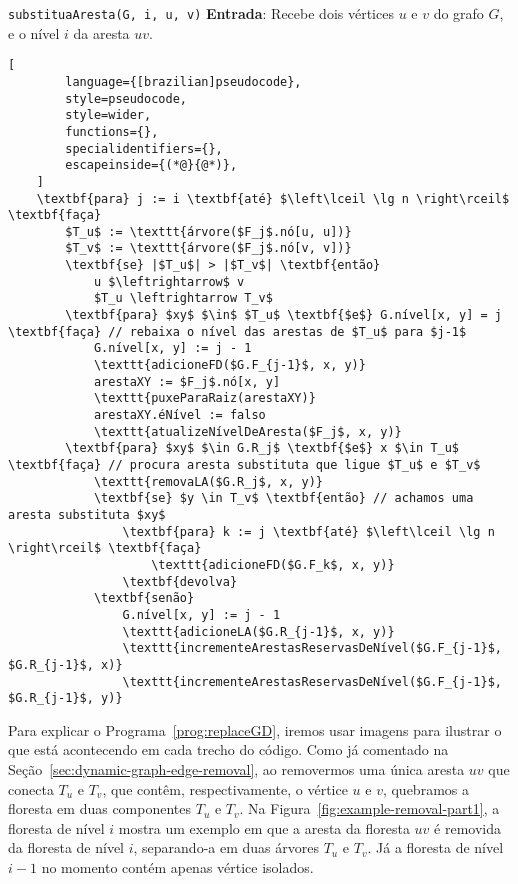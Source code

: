 \begin{programruledcaption}{\texttt{substituaAresta(G, i, u, v)} \label{prog:replaceGD}}
    \noindent\textbf{Entrada}: Recebe dois vértices $u$ e $v$ do grafo $G$, e o nível $i$ da aresta $uv$.
    \vspace{-0.5\baselineskip}
    \begin{lstlisting}[
        language={[brazilian]pseudocode},
        style=pseudocode,
        style=wider,
        functions={},
        specialidentifiers={},
        escapeinside={(*@}{@*)},
    ]
    \textbf{para} j := i \textbf{até} $\left\lceil \lg n \right\rceil$ \textbf{faça}
        $T_u$ := \texttt{árvore($F_j$.nó[u, u])}
        $T_v$ := \texttt{árvore($F_j$.nó[v, v])}    
        \textbf{se} |$T_u$| > |$T_v$| \textbf{então}
            u $\leftrightarrow$ v
            $T_u \leftrightarrow T_v$
        \textbf{para} $xy$ $\in$ $T_u$ \textbf{$e$} G.nível[x, y] = j \textbf{faça} // rebaixa o nível das arestas de $T_u$ para $j-1$
            G.nível[x, y] := j - 1
            \texttt{adicioneFD($G.F_{j-1}$, x, y)}
            arestaXY := $F_j$.nó[x, y]
            \texttt{puxeParaRaiz(arestaXY)}
            arestaXY.éNível := falso
            \texttt{atualizeNívelDeAresta($F_j$, x, y)}
        \textbf{para} $xy$ $\in G.R_j$ \textbf{$e$} x $\in T_u$ \textbf{faça} // procura aresta substituta que ligue $T_u$ e $T_v$
            \texttt{removaLA($G.R_j$, x, y)} 
            \textbf{se} $y \in T_v$ \textbf{então} // achamos uma aresta substituta $xy$
                \textbf{para} k := j \textbf{até} $\left\lceil \lg n \right\rceil$ \textbf{faça}
                    \texttt{adicioneFD($G.F_k$, x, y)}
                \textbf{devolva}
            \textbf{senão}
                G.nível[x, y] := j - 1
                \texttt{adicioneLA($G.R_{j-1}$, x, y)}
                \texttt{incrementeArestasReservasDeNível($G.F_{j-1}$, $G.R_{j-1}$, x)}
                \texttt{incrementeArestasReservasDeNível($G.F_{j-1}$, $G.R_{j-1}$, y)}

    \end{lstlisting}
    \vspace{-0.5\baselineskip}
\end{programruledcaption}

Para explicar o Programa~\ref{prog:replaceGD}, iremos usar imagens para ilustrar o que está acontecendo em cada trecho do código. Como já comentado na Seção~\ref{sec:dynamic-graph-edge-removal}, ao removermos uma única aresta $uv$ que conecta $T_u$ e $T_v$, que contêm, respectivamente, o vértice $u$ e $v$, quebramos a floresta em duas componentes $T_u$ e $T_v$. Na Figura~\ref{fig:example-removal-part1}, a floresta de nível $i$ mostra um exemplo em que a aresta da floresta $uv$ é removida da floresta de nível $i$, separando-a em duas árvores $T_u$ e $T_v$. Já a floresta de nível $i-1$ no momento contém apenas vértice isolados.

